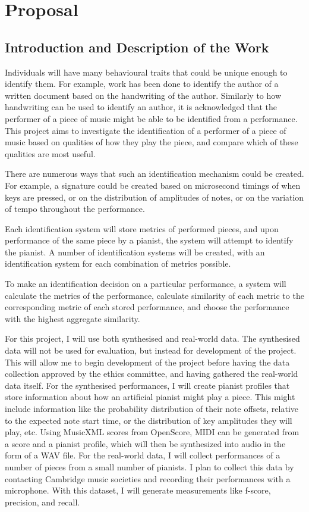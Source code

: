 \documentclass[oneside]{book}
\begin{document}

\chapter*{Proposal}

\section*{Introduction and Description of the Work}

Individuals will have many behavioural traits that could be unique enough to identify them. For example, work has been done to identify the author of a written document based on the handwriting of the author. Similarly to how handwriting can be used to identify an author, it is acknowledged that the performer of a piece of music might be able to be identified from a performance. This project aims to investigate the identification of a performer of a piece of music based on qualities of how they play the piece, and compare which of these qualities are most useful.

There are numerous ways that such an identification mechanism could be created. For example, a signature could be created based on microsecond timings of when keys are pressed, or on the distribution of amplitudes of notes, or on the variation of tempo throughout the performance.

Each identification system will store metrics of performed pieces, and upon performance of the same piece by a pianist, the system will attempt to identify the pianist. A number of identification systems will be created, with an identification system for each combination of metrics possible.

To make an identification decision on a particular performance, a system will calculate the metrics of the performance, calculate similarity of each metric to the corresponding metric of each stored performance, and choose the performance with the highest aggregate similarity.

For this project, I will use both synthesised and real-world data. The synthesised data will not be used for evaluation, but instead for development of the project. This will allow me to begin development of the project before having the data collection approved by the ethics committee, and having gathered the real-world data itself. For the synthesised performances, I will create pianist profiles that store information about how an artificial pianist might play a piece. This might include information like the probability distribution of their note offsets, relative to the expected note start time, or the distribution of key amplitudes they will play, etc. Using MusicXML scores from OpenScore, MIDI can be generated from a score and a pianist profile, which will then be synthesized into audio in the form of a WAV file. For the real-world data, I will collect performances of a number of pieces from a small number of pianists. I plan to collect this data by contacting Cambridge music societies and recording their performances with a microphone. With this dataset, I will generate measurements like f-score, precision, and recall.
\end{document}

